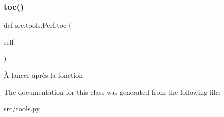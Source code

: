 \subsubsection{\texorpdfstring{toc()}{toc()}}
{\footnotesize\ttfamily def src.\+tools.\+Perf.\+toc (\begin{DoxyParamCaption}\item[{}]{self }\end{DoxyParamCaption})}

\begin{DoxyVerb}À lancer après la fonction \end{DoxyVerb}
 

The documentation for this class was generated from the following file\+:\begin{DoxyCompactItemize}
\item 
src/tools.\+py\end{DoxyCompactItemize}
